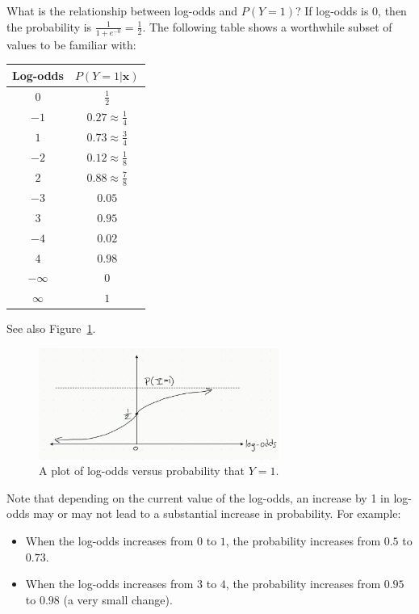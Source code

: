 \documentclass[12pt, a4paper]{article}
\theoremstyle{definition}
\begin{document}
	What is the relationship between log-odds and $P(Y=1)$? If log-odds is $0$,
	then the probability is $\frac{1}{1 + e^{-0}} = \frac{1}{2}$. The following
	table shows a worthwhile subset of values to be familiar with:
	\begin{center}
		\begin{tabular}{c|c}
			Log-odds & $P(Y=1|\mathbf{x})$\\
			\hline
			$0$ & $\frac{1}{2}$ \\
			$-1$ & $0.27\approx \frac{1}{4}$\\
			$1$ & $0.73\approx \frac{3}{4}$\\
			$-2$ & $0.12\approx \frac{1}{8}$\\
			$2$ & $0.88\approx \frac{7}{8}$\\
			$-3$ & $0.05$\\
			$3$ & $0.95$\\
			$-4$ & $0.02$\\
			$4$ & $0.98$\\
			\hline
			$-\infty$ & $0$\\
			$\infty$ & $1$
		\end{tabular}
	\end{center}
	See also Figure~\ref{fig:log-odds-probability-plot}.
	\begin{figure}
		\centering
		\includegraphics[width=0.7\textwidth]{log-odds-probability-plot}
		\caption{A plot of log-odds versus probability that $Y=1$.}
		\label{fig:log-odds-probability-plot}
	\end{figure}
	Note that depending on the current value of the log-odds, an increase
	by 1 in log-odds may or may not lead to a substantial increase in probability. For example:
	\begin{itemize}
		\item When the log-odds increases from $0$ to $1$, the probability increases
		from $0.5$ to $0.73$.
		\item When the log-odds increases from $3$ to $4$, the probability increases from
		$0.95$ to $0.98$ (a very small change).
	\end{itemize}
\end{document}
